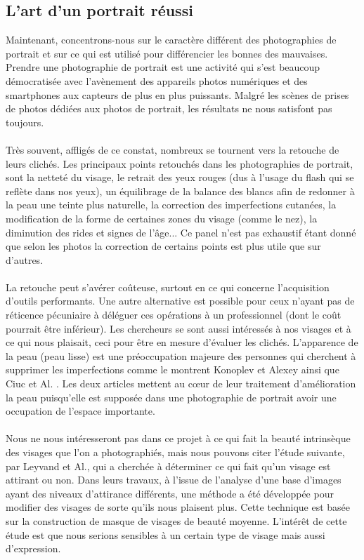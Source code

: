 \documentclass[11pt, french,screen]{report-rd-info}
\begin{document}
\subsection{L’art d’un portrait réussi}
Maintenant, concentrons-nous sur le caractère différent des photographies de portrait et sur ce qui est utilisé pour différencier les bonnes des mauvaises.
Prendre une photographie de portrait est une activité qui s'est beaucoup démocratisée avec l'avènement des appareils photos numériques et des smartphones aux capteurs de plus en plus puissants. Malgré les scènes de prises de photos dédiées aux photos de portrait, les résultats ne nous satisfont pas toujours.
\paragraph*{}
Très souvent, affligés de ce constat, nombreux se tournent vers la retouche de leurs clichés. Les principaux points retouchés dans les photographies de portrait, sont la netteté du visage, le retrait des yeux rouges (dus à l'usage du flash qui se reflète dans nos yeux), un équilibrage de la balance des blancs afin de redonner à la peau une teinte plus naturelle, la correction des imperfections cutanées, la modification de la forme de certaines zones du visage (comme le nez), la diminution des rides et signes de l'âge... Ce panel n'est pas exhaustif étant donné que selon les photos la correction de certains points est plus utile que sur d'autres.
\paragraph*{}
La retouche peut s'avérer coûteuse, surtout en ce qui concerne l'acquisition d'outils performants. Une autre alternative est possible pour ceux n'ayant pas de réticence pécuniaire à déléguer ces opérations à un professionnel (dont le coût pourrait être inférieur). Les chercheurs se sont aussi intéressés à nos visages et à ce qui nous plaisait, ceci pour être en mesure d'évaluer les clichés. L’apparence de la peau (peau lisse) est une préoccupation majeure des personnes qui cherchent à supprimer les imperfections comme le montrent Konoplev et Alexey \cite{Konoplev2012} ainsi que Ciuc et Al. \cite{Ciuc2010}. Les deux articles mettent au cœur de leur traitement d'amélioration la peau puisqu'elle est supposée dans une photographie de portrait avoir une occupation de l'espace importante.
\paragraph*{}
Nous ne nous intéresseront pas dans ce projet à ce qui fait la beauté intrinsèque des visages que l'on a photographiés, mais nous pouvons citer l'étude suivante, par Leyvand et Al.\cite{Leyvand2008}, qui a cherchée à déterminer ce qui fait qu'un visage est attirant ou non. Dans leurs travaux, à l'issue de l'analyse d'une base d'images ayant des niveaux d'attirance différents,  une méthode a été développée pour modifier des visages de sorte qu'ils nous plaisent plus. Cette technique est basée sur la construction de masque de visages de beauté moyenne. L'intérêt de cette étude est que nous serions sensibles à un certain type de visage mais aussi d'expression.
\end{document}
